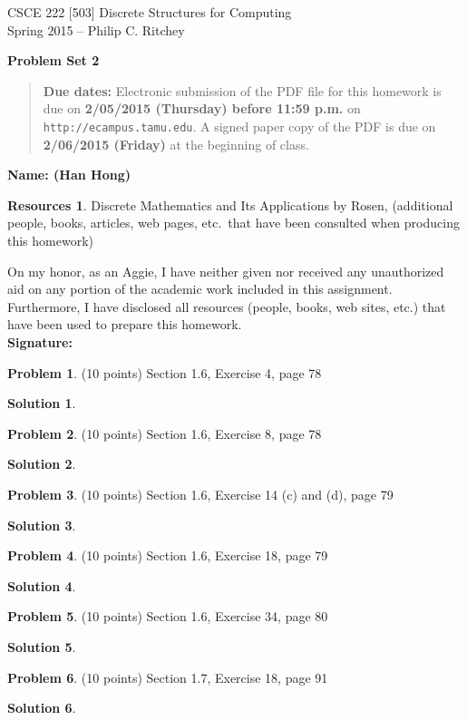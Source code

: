 \documentclass{article}
\theoremstyle{definition}
\newtheorem{problem}{Problem}
\newtheorem*{solution}{Solution}
\newtheorem*{resources}{Resources}
\newcommand{\name}[1]{\noindent\textbf{Name: #1}}
\newcommand{\honor}{\noindent On my honor, as an Aggie, I have neither
  given nor received any unauthorized aid on any portion of the
  academic work included in this assignment. Furthermore, I have
  disclosed all resources (people, books, web sites, etc.) that have
  been used to prepare this homework. \\[2ex]
 \textbf{Signature:} \underline{\hspace*{7cm}} }
\newcommand{\problemset}[1]{\begin{center}\textbf{Problem Set #1}\end{center}}
\newcommand{\duedate}[2]{\begin{quote}\textbf{Due dates:} Electronic
    submission of the PDF file for this homework is due on
    \textbf{#1} on \texttt{http://ecampus.tamu.edu}.  A signed paper copy of the PDF is due on
    \textbf{#2} at the beginning of class.\end{quote} }
\begin{document}
\begin{center}
{\large
CSCE 222 [503] Discrete Structures for Computing\\[.5ex]
Spring 2015 -- Philip C. Ritchey\\}
\end{center}

\problemset{2}

\duedate{2/05/2015 (Thursday) before 11:59 p.m.}{2/06/2015 (Friday)}

\name{ (Han Hong) }

\begin{resources} Discrete Mathematics and Its Applications by Rosen, (additional people, books, articles, web pages, etc.\ that
  have been consulted when producing this homework)
\end{resources}

\honor

\bigskip

\begin{problem} (10 points)
Section 1.6, Exercise 4, page 78
\end{problem}
\begin{solution}
\end{solution}

\begin{problem} (10 points)
Section 1.6, Exercise 8, page 78
\end{problem}
\begin{solution}
\end{solution}

\begin{problem} (10 points)
Section 1.6, Exercise 14 (c) and (d), page 79
\end{problem}
\begin{solution}
\end{solution}

\begin{problem} (10 points)
Section 1.6, Exercise 18, page 79
\end{problem}
\begin{solution}
\end{solution}

\begin{problem} (10 points)
Section 1.6, Exercise 34, page 80
\end{problem}
\begin{solution}
\end{solution}

\begin{problem} (10 points)
Section 1.7, Exercise 18, page 91
\end{problem}
\begin{solution}
\end{solution}
\end{document}
